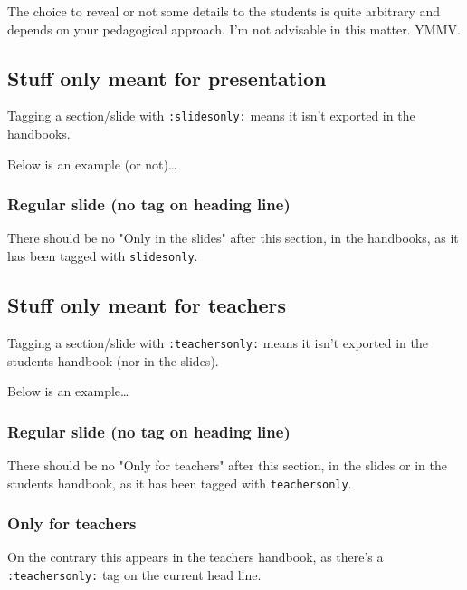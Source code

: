\documentclass[a4paper]{article}
\newenvironment{NOTES}{\begin{lrbox}{\mybox}\begin{minipage}{0.9\textwidth}\begin{shaded}}{\end{shaded}\end{minipage}\end{lrbox}\fbox{\usebox{\mybox}}}
\begin{document}
\begin{NOTES}
The choice to reveal or not some details to the students is quite arbitrary and depends on your pedagogical approach. I'm not advisable in this matter. YMMV.
\end{NOTES}

\subsection{Stuff only meant for presentation}
\label{sec:org10f6515}

Tagging a section/slide with \texttt{:slidesonly:} means it isn't exported in the handbooks.

Below is an example (or not)\ldots{}

\subsubsection{Regular slide (no tag on heading line)}
\label{sec:org5d994b0}

There should be no "Only in the slides" after this section, in the
handbooks, as it has been tagged with \texttt{slidesonly}.

\subsection{Stuff only meant for teachers}
\label{sec:org04f6951}

Tagging a section/slide with \texttt{:teachersonly:} means it isn't exported in the students handbook (nor in the slides).

Below is an example\ldots{}

\subsubsection{Regular slide (no tag on heading line)}
\label{sec:org31f9b21}

There should be no "Only for teachers" after this section, in the slides or in the
students handbook, as it has been tagged with \texttt{teachersonly}.

\subsubsection{Only for teachers}
\label{sec:org6d1bae8}

On the contrary this appears in the teachers handbook, as there's a \texttt{:teachersonly:} tag on the current head line.
\end{document}
